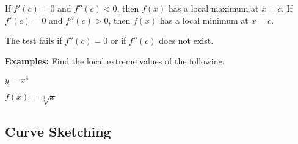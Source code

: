 \documentclass[addpoints, 12pt]{exam}
\begin{document}
\newpage


\begin{tcolorbox}[title= THE SECOND DERIVATIVE TEST,colframe=black,sharp corners,colback=white,colbacktitle=white,coltitle=black,boxrule=1pt]

    \begin{questions}
        \question If $f'(c)=0$ and $f''(c)<0$, then $f(x)$ has a local maximum at $x=c$.
        \question If $f'(c)=0$ and $f''(c)>0$, then $f(x)$ has a local minimum at $x=c$.
    \end{questions}
    
    The test fails if $f''(c)=0$ or if $f''(c)$ does not exist.
    
\end{tcolorbox}

\textbf{Examples:} Find the local extreme values of the following.
\begin{questions}
    \begin{minipage}{.45\linewidth}
        \question $y=x^4$
    \end{minipage}
    \hfill
    \begin{minipage}{.45\linewidth}
        \question $f(x)=\sqrt[3]{x}$
    \end{minipage}

\end{questions}

\subsection*{Curve Sketching}
\end{document}
